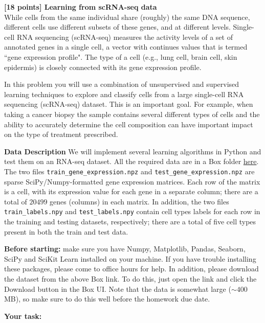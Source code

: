 {\bf [18 points] Learning from scRNA-seq data}\\
While cells from the same individual share (roughly) the same DNA
sequence, different cells use different subsets of these genes,
and at different levels. Single-cell RNA sequencing (scRNA-seq) measures the
activity levels of a set of annotated genes in a single cell, a vector with continues
values that is termed ``gene expression profile". The type of a cell (e.g., lung cell,
brain cell, skin epidermis) is closely connected with its gene expression profile.

In this problem you will use a combination of unsupervised and supervised learning techniques to explore and classify cells from a large single-cell RNA sequencing (scRNA-seq) dataset. This is an important goal. For example, when taking a cancer biopsy the sample contains several different
types of cells and the ability to accurately determine the cell composition can
have important impact on the type of treatment prescribed. 

\textbf{Data Description}
We will implement several learning algorithms in Python and test them on an RNA-seq dataset. All the required data are in a Box folder \href{https://cmu.box.com/s/93hufa5pk5envnrlvesso2ks0q0btchy}{here}. The two files \texttt{train\_gene\_expression.npz} and \texttt{test\_gene\_expression.npz} are sparse SciPy/Numpy-formatted gene expression matrices. Each row of the matrix is a cell, with its expression value for each gene in a separate column; there are a total of $20499$ genes (columns) in each matrix. In addition, the two files \texttt{train\_labels.npy} and \texttt{test\_labels.npy} contain cell types labels for each row in the training and testing datasets, respectively; there are a total of five cell types present in both the train and test data.

\textbf{Before starting:} make sure you have Numpy, Matplotlib, Pandas, Seaborn, SciPy and SciKit Learn installed on your machine. If you have trouble installing these packages, please come to office hours for help. In addition, please download the dataset from the above Box link. To do this, just open the link and click the Download button in the Box UI. Note that the data is somewhat large ($\sim 400$ MB), so make sure to do this well before the homework due date.

\textbf{Your task:}

